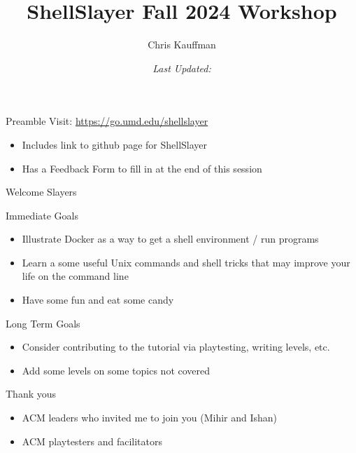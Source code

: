 \documentclass[mathserif]{beamer}
\author{Chris Kauffman}
\date{\it Last Updated: \newline }
\title{ShellSlayer Fall 2024 Workshop}
\begin{document}
\maketitle

\begin{frame}[label={sec:org602ceab}]{Preamble}
Visit: \url{https://go.umd.edu/shellslayer}
\begin{itemize}
\item Includes link to github page for ShellSlayer
\item Has a Feedback Form to fill in at the end of this session
\end{itemize}
\end{frame}

\begin{frame}[label={sec:orgaf8cf21}]{Welcome Slayers}
\begin{block}{Immediate Goals}
\begin{itemize}
\item Illustrate Docker as a way to get a shell environment / run programs
\item Learn a some useful Unix commands and shell tricks that may improve
your life on the command line
\item Have some fun and eat some candy
\end{itemize}
\end{block}

\begin{block}{Long Term Goals}
\begin{itemize}
\item Consider contributing to the tutorial via playtesting, writing
levels, etc.
\item Add some levels on some topics not covered
\end{itemize}
\end{block}

\begin{block}{Thank yous}
\begin{itemize}
\item ACM leaders who invited me to join you (Mihir and Ishan)
\item ACM playtesters and facilitators
\end{itemize}
\end{block}
\end{frame}
\end{document}
